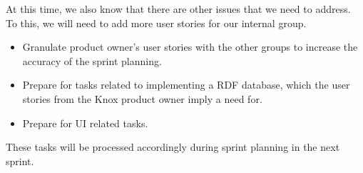 At this time, we also know that there are other issues that we need to address. To this, we will need to add more user stories for our internal group.

\begin{itemize}
    \item Granulate product owner's user stories with the other \knox groups to increase the accuracy of the sprint planning.
    \item Prepare for tasks related to implementing a RDF database, which the user stories from the Knox product owner imply a need for.
    \item Prepare for UI related tasks.
\end{itemize}

These tasks will be processed accordingly during sprint planning in the next sprint.
